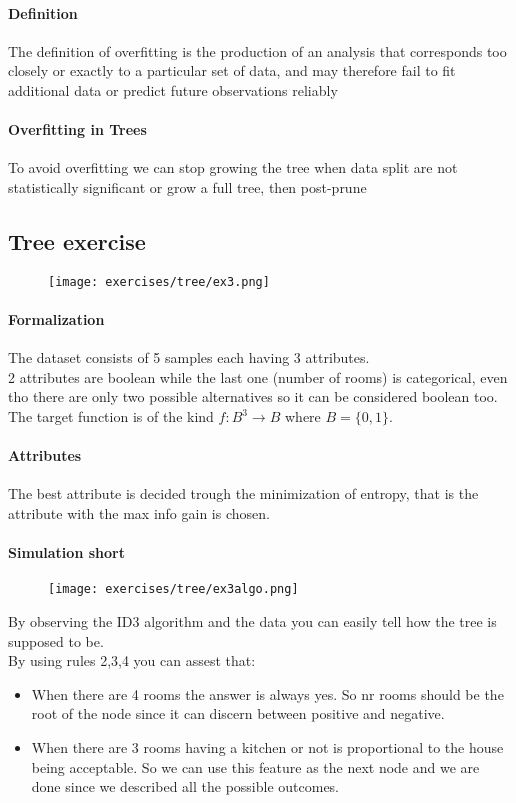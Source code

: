 \paragraph{Definition}
The definition of overfitting is the production of an analysis that corresponds too closely or exactly to a particular set of data, and may therefore fail to fit additional data or predict future observations reliably

\paragraph{Overfitting in Trees}
To avoid overfitting we can stop growing the tree when data split  are not statistically significant  or grow a full tree, then post-prune

\subsection{Tree exercise}
\begin{figure}[H]
    \centering
    \texttt{[image: exercises/tree/ex3.png]}
\end{figure}

\paragraph{Formalization}
The dataset consists of  5 samples each having 3 attributes.\\
2 attributes are boolean while the last one (number of rooms) is categorical, even tho there are only two possible alternatives so it can be considered boolean too.\\
The target function is of the kind $f:B^3 \to B$ where $B=\{0,1\}$.

\paragraph{Attributes}
The best attribute is decided trough the minimization of entropy, that is the attribute with the max info gain is chosen.


\paragraph{Simulation short}
\begin{figure}[H]
    \centering
    \texttt{[image: exercises/tree/ex3algo.png]}
\end{figure}


By observing the ID3 algorithm and the data you can easily tell how the tree is supposed to be.\\
By using rules 2,3,4 you can assest that:
\begin{itemize}
\item When there are 4 rooms the answer is always yes. So nr rooms should be the root of the node since it can discern between positive and negative.
\item When there are 3 rooms having a kitchen or not is proportional to the house being acceptable. So we can use this feature as the next node and we are done since we described all the possible outcomes. 
\end{itemize}

